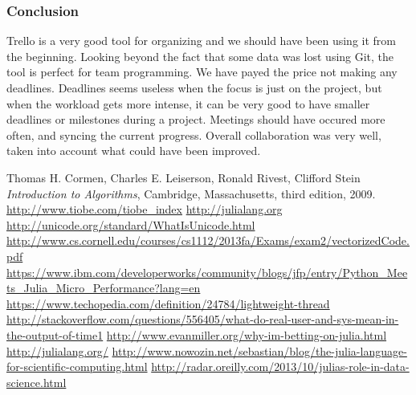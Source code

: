 \documentclass[a4paper, 11pt, titlepage]{article}
\begin{document}
\subsubsection{Conclusion}
Trello is a very good tool for organizing and we should have been using it from the beginning. Looking beyond the fact that some data was lost using Git, the tool is perfect for team programming. We have payed the price not making any deadlines. Deadlines seems useless when the focus is just on the project, but when the workload gets more intense, it can be very good to have smaller deadlines or milestones during a project. Meetings should have occured more often, and syncing the current progress. Overall collaboration was very well, taken into account what could have been improved.

\begin{thebibliography}{9}
	
	Thomas H. Cormen, Charles E. Leiserson, Ronald Rivest, Clifford Stein
	\emph{Introduction to Algorithms},
	Cambridge, Massachusetts,
	third edition,
	2009.
	\url{http://www.tiobe.com/tiobe\_index}
	\url{http://julialang.org}
	\url{http://unicode.org/standard/WhatIsUnicode.html}
	\url{http://www.cs.cornell.edu/courses/cs1112/2013fa/Exams/exam2/vectorizedCode.pdf}
	\url{https://www.ibm.com/developerworks/community/blogs/jfp/entry/Python_Meets_Julia_Micro_Performance?lang=en}
	\url{https://www.techopedia.com/definition/24784/lightweight-thread}
	\url{http://stackoverflow.com/questions/556405/what-do-real-user-and-sys-mean-in-the-output-of-time1}
	\url{http://www.evanmiller.org/why-im-betting-on-julia.html}
	\url{http://julialang.org/}
	\url{http://www.nowozin.net/sebastian/blog/the-julia-language-for-scientific-computing.html}
	\url{http://radar.oreilly.com/2013/10/julias-role-in-data-science.html}
\end{thebibliography}
\end{document}
